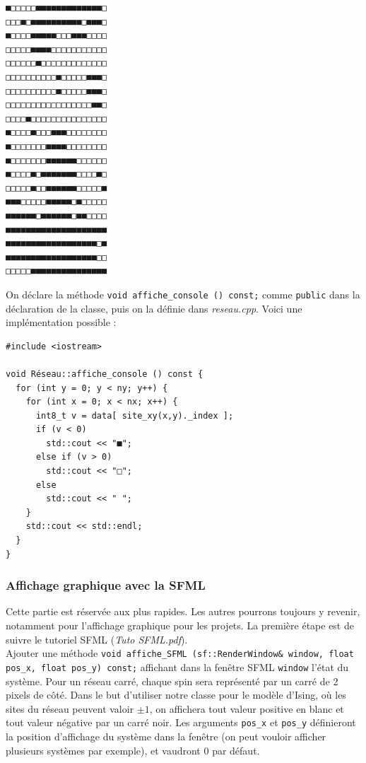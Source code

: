 \documentclass{book}
\newcommand{\inline}[1]{\texttt{#1}}
\def\filename{\emph}
\begin{document}
\begin{verbatim}
■□□□□□■■■■■■■■■■■■■□
□□□■□■■■■■■■■■■□■■■□
■□□□□■■■■■□□□■■■□□□□
□□□□□■■■■□□□□□□□□□□□
□□□□□□■□□□□□□□□□□□□□
□□□□□□□□□□■□□□□□■■■□
□□□□□□□□□□■□□□□□■■■□
□□□□□□□□□□□□□□□□□■■□
□□□□■□□□□□□□□□□□□□□□
■□□□□■□□□■■■□□□□□□□□
■□□□□□□□■■■■□□□□□□□□
■□□□□□□□■■■■■■□□□□□□
■□□□□■□■■■■■■■□□□□■□
□□□□□■□□■■■■■■□□□□□■
■■■□□□□□■■■■■□■□□□□□
■■■■■■□■■■■■■□■■□□□□
■■■■■■■■■■■■■■■■■■■■
■■■■■■■■■■■■■■■■■■□■
■■■■■■■■■■■■■■■■■■□□
□□□□□■■■■■■■■■■■■■■■
\end{verbatim}

\begin{correction}
On déclare la méthode \inline{void affiche_console () const;} comme \inline{public} dans la déclaration de la classe, puis on la définie dans \filename{reseau.cpp}. Voici une implémentation possible :
\begin{verbatim}
#include <iostream>

void Réseau::affiche_console () const {
  for (int y = 0; y < ny; y++) {
    for (int x = 0; x < nx; x++) {
      int8_t v = data[ site_xy(x,y)._index ];
      if (v < 0)
        std::cout << "■";
      else if (v > 0)
        std::cout << "□";
      else
        std::cout << " ";
    }
    std::cout << std::endl;
  }
}
\end{verbatim}
\end{correction}

\subsubsection{Affichage graphique avec la SFML}

Cette partie est réservée aux plus rapides. Les autres pourrons toujours y revenir, notamment pour l'affichage graphique pour les projets. La première étape est de suivre le tutoriel SFML (\filename{Tuto SFML.pdf}).\\ 

Ajouter une méthode \inline{void affiche_SFML (sf::RenderWindow& window, float pos_x, float pos_y) const;} affichant dans la fenêtre SFML \inline{window} l'état du système. Pour un réseau carré, chaque spin sera représenté par un carré de 2 pixels de côté. Dans le but d'utiliser notre classe pour le modèle d'Ising, où les sites du réseau peuvent valoir $\pm 1$, on affichera tout valeur positive en blanc et tout valeur négative par un carré noir. Les arguments \inline{pos_x} et \inline{pos_y} définieront la position d'affichage du système dans la fenêtre (on peut vouloir afficher plusieurs systèmes par exemple), et vaudront 0 par défaut.\\
\end{document}
